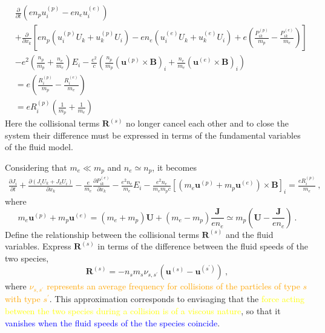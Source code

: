 \documentclass[12pt,a4paper]{article}
\renewcommand{\vec}[1]{\boldsymbol{#1}}
\begin{document}
\begin{align*}
& \frac{\partial }{\partial t}\left(en_p u_i^{(p)} -en_e u_i^{(e)} \right) \\
& +\frac{\partial }{\partial x_k}\left[en_p \left(u_i^{(p)} U_k +u_k^{(p)} U_i \right) -en_e\left(u_i^{(e)} U_k +u_k^{(e)} U_i \right) +e\left(\frac{P_{ik}^{(p)}}{m_p} -\frac{P_{ik}^{(e)}}{m_e}\right) \right] \\
& -e^2 \left(\frac{n_p}{m_p} +\frac{n_e}{m_e} \right) E_i -\frac{e^2}{c} \left(\frac{n_p}{m_p} (\vec{u}^{(p)}\times \vec{B})_i +\frac{n_e}{m_e} (\vec{u}^{(e)}\times \vec{B})_i \right) \\
&= e\left(\frac{R_{i}^{(p)}}{m_p} -\frac{R_{i}^{(e)}}{m_e}\right) \\
&= eR_{i}^{(p)} \left(\frac{1}{m_p} +\frac{1}{m_e}\right)
\end{align*}
Here the collisional terms $\vec{R}^{(s)}$ no longer cancel each other and to close the system their difference must be expressed  in terms of the fundamental variables of the fluid model. 

Considering that $m_e \ll m_p$ and $n_e \simeq n_p$, it becomes
\begin{align}
\frac{\partial J_i}{\partial t} +\frac{\partial \left(J_i U_k +J_k U_i \right)}{\partial x_k} - \frac{e}{m_e} \frac{\partial P_{ik}^{(e)}}{\partial x_k} -\frac{e^2 n_e}{m_e}E_i -\frac{e^2 n_e}{m_e m_p c} \left[ \left(m_e \vec{u}^{(p)} + m_p \vec{u}^{(e)}\right) \times \vec{B} \right]_i = \frac{e R_{i}^{(p)}}{m_e} ~,
\label{miss_equ}
\end{align}
where
\begin{equation*}
m_e \vec{u}^{(p)} + m_p \vec{u}^{(e)} = (m_e +m_p) \vec{U} + (m_e -m_p) \frac{\vec{J}}{en_e} \simeq m_p\left(\vec{U} -\frac{\vec{J}}{en_e} \right) ~.
\end{equation*}
Define the relationship between the collisional terms $\vec{R}^{(s)}$ and the fluid variables. Express $\vec{R}^{(s)}$ in terms of the difference between the fluid speeds of the two species,
\begin{equation*}
\vec{R}^{(s)} = -n_s m_s \nu_{s,s^\prime} \left(\vec{u}^{(s)} - \vec{u}^{(s^\prime )}\right) ~,
\end{equation*}
where \textcolor{orange}{$\nu_{s,s^\prime}$ represents an average frequency for collisions of the particles of type $s$ with type $s^\prime$}. This approximation corresponds to envisaging that the \textcolor{yellow}{force acting between the two species during a collision is of a viscous nature}, so that it \textcolor{blue}{vanishes when the fluid speeds of the the species coincide}.
\end{document}
